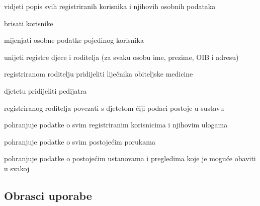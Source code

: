\begin{packed_enum}
\begin{packed_enum}
					\item vidjeti popis svih registriranih korisnika i njihovih osobnih podataka
					\item brisati korisnike
					\item mijenjati osobne podatke pojedinog korisnika
					\item unijeti registre djece i roditelja (za svaku osobu ime, prezime, OIB i adresu)
					\item registriranom roditelju pridijeliti liječnika obiteljske medicine
					\item djetetu pridijeliti pedijatra
					\item registriranog roditelja povezati s djetetom čiji podaci postoje u sustavu
					
				\end{packed_enum}
				
				\item  {}
				
				\begin{packed_enum}
					
					\item pohranjuje podatke o svim registriranim korisnicima i njihovim ulogama
					\item pohranjuje podatke o svim postojećim porukama
					\item pohranjuje podatke o postojećim ustanovama i pregledima koje je moguće obaviti u svakoj
					
				\end{packed_enum}
				
				
			\end{packed_enum}
			
			\eject 
			
			
				
			\subsection{Obrasci uporabe}
										
